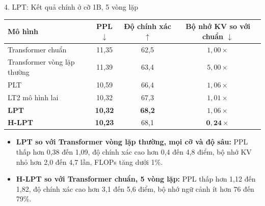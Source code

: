 \begin{frame}{4. LPT: Kết quả chính ở cỡ 1B, 5 vòng lặp}
    \begin{table}[h]
        \centering
        \small
        \begin{tabular}{lccc}
            \toprule
            \textbf{Mô hình} & \textbf{PPL} $\downarrow$ & \textbf{Độ chính xác} $\uparrow$ & \textbf{Bộ nhớ KV so với chuẩn} $\downarrow$ \\
            \midrule
            Transformer chuẩn & 11,35 & 62,5 & $1{,}00\times$ \\
            Transformer vòng lặp thường & 11,39 & 63,4 & $5{,}00\times$ \\
            PLT & 10,59 & 66,4 & $1{,}06\times$ \\
            LT2 mô hình lai & 10,32 & 67,3 & $1{,}01\times$ \\
            \midrule
            \textbf{LPT} & \textbf{10,32} & \textbf{68,2} & $1{,}06\times$ \\
            \textbf{H-LPT} & \textbf{10,23} & 68,1 & $\mathbf{0{,}24\times}$ \\
            \bottomrule
        \end{tabular}
    \end{table}
    \vspace{-0.2cm}
    \begin{small}
    \begin{itemize}
        \item \textbf{LPT so với Transformer vòng lặp thường, mọi cỡ và độ sâu:} PPL thấp hơn 0,38 đến 1,09, độ chính xác cao hơn 0,4 đến 4,8 điểm, bộ nhớ KV nhỏ hơn 2,0 đến 4,7 lần, FLOPs tăng dưới 1\%.
        \item \textbf{H-LPT so với Transformer chuẩn, 5 vòng lặp:} PPL thấp hơn 1,12 đến 1,82, độ chính xác cao hơn 3,1 đến 5,6 điểm, bộ nhớ ngữ cảnh ít hơn 76 đến 79\%.
    \end{itemize}
    \end{small}
\end{frame}

